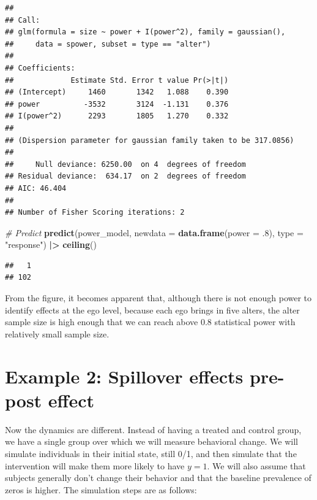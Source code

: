 \documentclass[
]{book}
\newenvironment{Shaded}{\begin{snugshade}}{\end{snugshade}}
\newcommand{\AttributeTok}[1]{\textcolor[rgb]{0.13,0.29,0.53}{#1}}
\newcommand{\CommentTok}[1]{\textcolor[rgb]{0.56,0.35,0.01}{\textit{#1}}}
\newcommand{\DecValTok}[1]{\textcolor[rgb]{0.00,0.00,0.81}{#1}}
\newcommand{\FunctionTok}[1]{\textcolor[rgb]{0.13,0.29,0.53}{\textbf{#1}}}
\newcommand{\NormalTok}[1]{#1}
\newcommand{\SpecialCharTok}[1]{\textcolor[rgb]{0.81,0.36,0.00}{\textbf{#1}}}
\newcommand{\StringTok}[1]{\textcolor[rgb]{0.31,0.60,0.02}{#1}}
\begin{document}
\begin{verbatim}
## 
## Call:
## glm(formula = size ~ power + I(power^2), family = gaussian(), 
##     data = spower, subset = type == "alter")
## 
## Coefficients:
##             Estimate Std. Error t value Pr(>|t|)
## (Intercept)     1460       1342   1.088    0.390
## power          -3532       3124  -1.131    0.376
## I(power^2)      2293       1805   1.270    0.332
## 
## (Dispersion parameter for gaussian family taken to be 317.0856)
## 
##     Null deviance: 6250.00  on 4  degrees of freedom
## Residual deviance:  634.17  on 2  degrees of freedom
## AIC: 46.404
## 
## Number of Fisher Scoring iterations: 2
\end{verbatim}

\begin{Shaded}
\begin{Highlighting}[]
\CommentTok{\# Predict}
\FunctionTok{predict}\NormalTok{(power\_model, }\AttributeTok{newdata =} \FunctionTok{data.frame}\NormalTok{(}\AttributeTok{power =}\NormalTok{ .}\DecValTok{8}\NormalTok{), }\AttributeTok{type =} \StringTok{"response"}\NormalTok{) }\SpecialCharTok{|\textgreater{}}
  \FunctionTok{ceiling}\NormalTok{()}
\end{Highlighting}
\end{Shaded}

\begin{verbatim}
##   1 
## 102
\end{verbatim}

From the figure, it becomes apparent that, although there is not enough power to identify effects at the ego level, because each ego brings in five alters, the alter sample size is high enough that we can reach above 0.8 statistical power with relatively small sample size.

\hypertarget{example-2-spillover-effects-pre-post-effect}{%
\section{Example 2: Spillover effects pre-post effect}\label{example-2-spillover-effects-pre-post-effect}}

Now the dynamics are different. Instead of having a treated and control group, we have a single group over which we will measure behavioral change. We will simulate individuals in their initial state, still 0/1, and then simulate that the intervention will make them more likely to have \(y = 1.\) We will also assume that subjects generally don't change their behavior and that the baseline prevalence of zeros is higher. The simulation steps are as follows:
\end{document}
